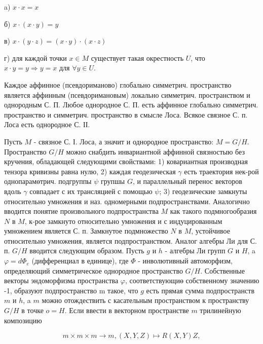 \documentclass[10pt]{article}
\begin{document}
a) $x \cdot x=x$



б) $x \cdot(x \cdot y)=y$



в) $x \cdot(y \cdot z)=(x \cdot y) \cdot(x \cdot z)$



г) для каждой точки $x \in M$ существует такая окрестность $U$, что $x \cdot y=y \Rightarrow y=x$ для $\forall y \in U$.



Каждое аффинное (псевдориманово) глобально симметрич. пространство является аффинным (псевдоримановым) локально симметрич. пространством и однородным С. П. Любое однородное С. П. есть аффинное глобально симметрич. пространство и симметрич. пространство в смысле Лоса. Всякое связное С. п. Лоса есть однородное С. ІІ.



Пусть $M$ - связное С. І. Лоса, а значит и однородное пространство: $M=G / H$. Пространство $G / H$ можно снабдить инвариантной аффинной связностыю без кручения, обладающей следующими свойствами: 1) ковариантная производная тензора кривизны равна нулю, 2) каждая геодезическая $\gamma$ есть траектория нек-рой однопарамөтрич. подгруппы $\psi$ групшы $G$, и параллельный перенос векторов вдоль $\gamma$ совпадает с их трансляцией с помощью $\psi$; 3) геодезические замкнуты относительно умножения и наз. одномерными подпространствами. Аналогично вводится понятие произвольного подпространства $M$ как такого подмногообразия $N$ в $M$, к-рое замкнуто относительно умножения и с индуцированным умножением является С. п. Замкнутое подмножество $N$ в $M$, устойчивое относительно умножения, является подпространством. Аналог алгебры Ли для С. п. $G / H$ вводится следующим образом. Пусть $g$ и $h$ - алгебры Ли групп $G$ и $H$, a $\varphi=d \Phi_{e}$ (дифференциал в единице), где $\Phi$ - инволютивный автоморфизм, определяющий симметрическое однородное пространство $G / H$. Собственные векторы эндоморфизма пространства $\varphi$, соответствующиө собственному значению -1, образуют подпространство $\mathrm{m}$ такое, что $g$ есть прямая сумма подпространств $m$ и $h$, a $m$ можно отождествить с касательным пространством к пространству $G / H$ в точке $o=H$. Если ввести в векторном пространстве $m$ трилинейную композицию



\[

m \times m \times m \longrightarrow m,(X, Y, Z) \longmapsto R(X, Y) Z,

\]
\end{document}
